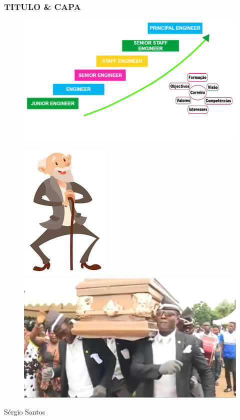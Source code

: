 \begin{frame}
\frametitle{TITULO \& CAPA}
\begin{minipage}{.5\linewidth}
\begin{figure}[ht]
\begin{flushleft}
\includegraphics[scale=0.35]{./image/Career_Path/Progressao.png}
\end{flushleft}
\end{figure}
\end{minipage}
\begin{minipage}{.45\linewidth}
\begin{figure}[ht]
	\begin{flushleft}
		\includegraphics[scale=0.25]{./image/Career_Path/Old_Age.jpeg}
	\end{flushleft}\vfill
	\begin{flushright}
		\includegraphics[scale=0.1]{./image/Career_Path/Burial.jpeg}
	\end{flushright}
\end{figure}
\end{minipage}
\vfill
\hfill {\tiny Sérgio Santos}
\end{frame}
